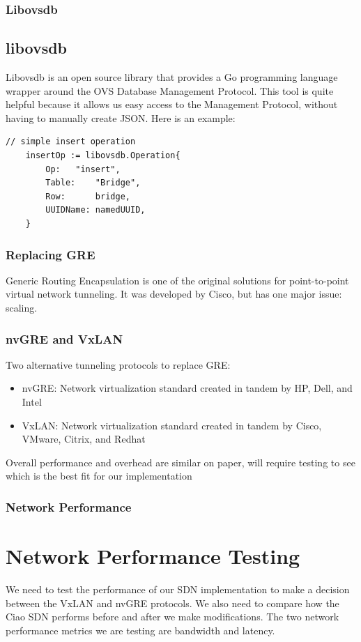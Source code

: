 \documentclass[pdf]{beamer}
\begin{document}
\begin{frame}[fragile]
	\frametitle{Libovsdb}
	\subsection{libovsdb}
	Libovsdb is an open source library that provides a Go programming
	language wrapper around the OVS Database Management Protocol. This tool
	is quite helpful because it allows us easy access to the Management
	Protocol, without having to manually create JSON. Here is
	an example:\cite{gosample} \\

\begin{lstlisting}[caption=Example insert operation using libovsdb]
	// simple insert operation
	insertOp := libovsdb.Operation{
	    Op:	  "insert",
	    Table:	  "Bridge",
	    Row:	  bridge,
	    UUIDName: namedUUID,
	}

\end{lstlisting}
\end{frame}
\begin{frame}
	\frametitle{Replacing GRE}
	Generic Routing Encapsulation is one of the original solutions for 
	point-to-point virtual network tunneling. It was developed by Cisco, but
	has one major issue: scaling.
\end{frame}
\begin{frame}
	\frametitle{nvGRE and VxLAN}
	Two alternative tunneling protocols to replace GRE:
	\begin{itemize}
		\item nvGRE: Network virtualization standard created in tandem
			by HP, Dell, and Intel
		\item VxLAN: Network virtualization standard created in tandem
			by Cisco, VMware, Citrix, and Redhat
	\end{itemize}
	Overall performance and overhead are similar on paper, will require
	testing to see which is the best fit for our implementation
\end{frame}

\begin{frame}[allowframebreaks]
	\frametitle{Network Performance}
	\section{Network Performance Testing}
	We need to test the performance of our SDN implementation to make 
	a decision between the VxLAN and nvGRE protocols.
	We also need to compare how the Ciao SDN performs before and after we make 
	modifications.
	The two network performance metrics we are testing are bandwidth and 
	latency.
\end{frame}
\end{document}
